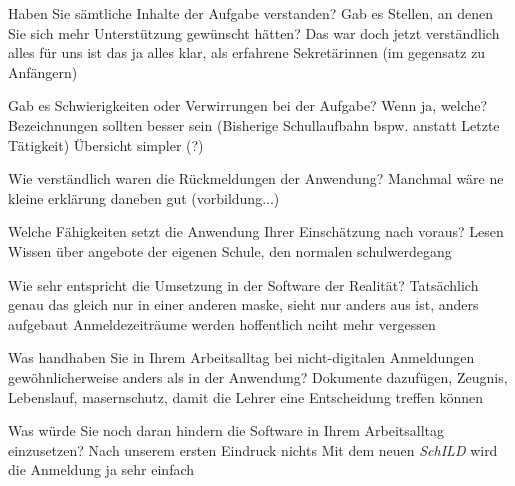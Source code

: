 Haben Sie sämtliche Inhalte der Aufgabe verstanden? Gab es Stellen, an denen Sie sich mehr Unterstützung gewünscht hätten?	
Das war doch jetzt verständlich alles
für uns ist das ja alles klar, als erfahrene Sekretärinnen
(im gegensatz zu Anfängern)

Gab es Schwierigkeiten oder Verwirrungen bei der Aufgabe? Wenn ja, welche?
Bezeichnungen sollten besser sein (Bisherige Schullaufbahn bspw. anstatt Letzte Tätigkeit)
Übersicht simpler (?)












Wie verständlich waren die Rückmeldungen der Anwendung?		
Manchmal wäre ne kleine erklärung daneben gut (vorbildung...)				










Welche Fähigkeiten setzt die Anwendung Ihrer Einschätzung nach voraus?
Lesen
Wissen über angebote der eigenen Schule, den normalen schulwerdegang

Wie sehr entspricht die Umsetzung in der Software der Realität? 	
Tatsächlich genau das gleich nur in einer anderen maske, 
sieht nur anders aus ist, anders aufgebaut
Anmeldezeiträume werden hoffentlich nciht mehr vergessen	











Was handhaben Sie in Ihrem Arbeitsalltag bei nicht-digitalen Anmeldungen gewöhnlicherweise anders als in der Anwendung?
Dokumente dazufügen, Zeugnis, Lebenslauf, masernschutz, damit die Lehrer eine Entscheidung treffen können


















Was würde Sie noch daran hindern die Software in Ihrem Arbeitsalltag einzusetzen?
Nach unserem ersten Eindruck nichts
Mit dem neuen \textit{SchILD} wird die Anmeldung ja sehr einfach


















